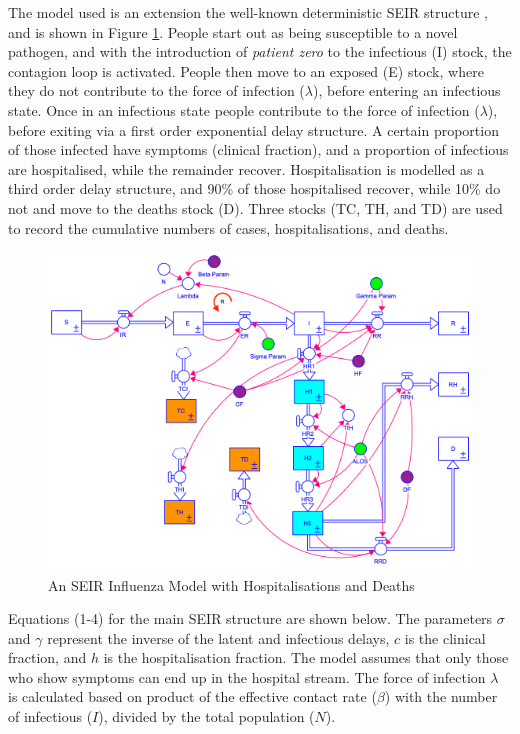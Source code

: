 \documentclass[10pt,letterpaper]{article}
\begin{document}
The model used is an extension the well-known deterministic SEIR structure \citep{vynnycky2010introduction}, and is shown in Figure \ref{fig:mod-seir}. People start out as being susceptible to a novel pathogen, and with the introduction of \emph{patient zero} to the infectious (I) stock, the contagion loop is activated. People then move to an exposed (E) stock, where they do not contribute to the force of infection (\(\lambda\)), before entering an infectious state. Once in an infectious state people contribute to the force of infection (\(\lambda\)), before exiting via a first order exponential delay structure. A certain proportion of those infected have symptoms (clinical fraction), and a proportion of infectious are hospitalised, while the remainder recover. Hospitalisation is modelled as a third order delay structure, and 90\% of those hospitalised recover, while 10\% do not and move to the deaths stock (D). Three stocks (TC, TH, and TD) are used to record the cumulative numbers of cases, hospitalisations, and deaths.

\begin{figure}
\includegraphics[width=1\linewidth]{diagrams/SEIR} \caption{An SEIR Influenza Model with Hospitalisations and Deaths}\label{fig:mod-seir}
\end{figure}

Equations (1-4) for the main SEIR structure are shown below. The parameters \(\sigma\) and \(\gamma\) represent the inverse of the latent and infectious delays, \(c\) is the clinical fraction, and \(h\) is the hospitalisation fraction. The model assumes that only those who show symptoms can end up in the hospital stream. The force of infection \(\lambda\) is calculated based on product of the effective contact rate (\(\beta\)) with the number of infectious (\(I\)), divided by the total population (\(N\)).
\end{document}
